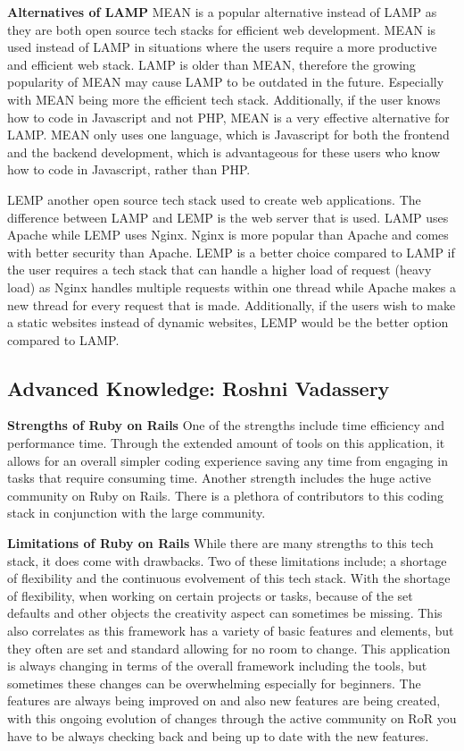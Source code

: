 \documentclass[a4paper, 11pt]{report}
\begin{document}
\textbf{Alternatives of LAMP}
MEAN is a popular alternative instead of LAMP as they are both open source tech stacks for efficient web development. MEAN is used instead of LAMP in situations where the users require a more productive and efficient web stack. LAMP is older than MEAN, therefore the growing popularity of MEAN may cause LAMP to be outdated in the future. Especially with MEAN being more the efficient tech stack. Additionally, if the user knows how to code in Javascript and not PHP, MEAN is a very effective alternative for LAMP. MEAN only uses one language, which is Javascript for both the frontend and the backend development, which is advantageous for these users who know how to code in Javascript, rather than PHP.

LEMP another open source tech stack used to create web applications. The difference between LAMP and LEMP is the web server that is used. LAMP uses Apache while LEMP uses Nginx. Nginx is more popular than Apache and comes with better security than Apache. LEMP is a better choice compared to LAMP if the user requires a tech stack that can handle a higher load of request (heavy load) as Nginx handles multiple requests within one thread while Apache makes a new thread for every request that is made. Additionally, if the users wish to make a static websites instead of dynamic websites, LEMP would be the better option compared to LAMP.


\subsection{Advanced Knowledge: Roshni Vadassery}

\textbf{Strengths of Ruby on Rails}
One of the strengths include time efficiency and performance time. Through the extended amount of tools on this application, it allows for an overall simpler coding experience saving any time from engaging in tasks that require consuming time.  Another strength includes the huge active community on Ruby on Rails. There is a plethora of contributors to this coding stack in conjunction with the large community.

\textbf{Limitations of Ruby on Rails}
While there are many strengths to this tech stack, it does come with drawbacks. Two of these limitations include; a shortage of flexibility and the continuous evolvement of this tech stack. With the shortage of flexibility, when working on certain projects or tasks, because of the set defaults and other objects the creativity aspect can sometimes be missing. This also correlates as this framework has a variety of basic features and elements, but they often are set and standard allowing for no room to change. This application is always changing in terms of the overall framework including the tools, but sometimes these changes can be overwhelming especially for beginners. The features are always being improved on and also new features are being created, with this ongoing evolution of changes through the active community on RoR you have to be always checking back and being up to date with the new features.
\end{document}
